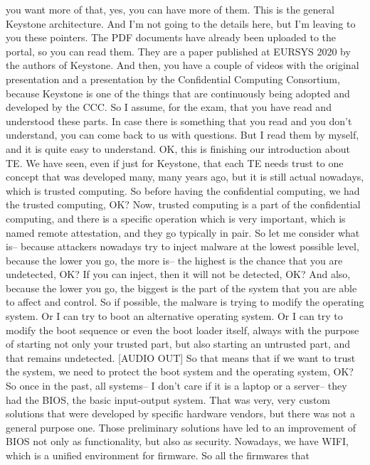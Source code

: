  you want more of that, yes, you can have more of them. This is the general
 Keystone architecture. And I'm not going to the details here, but I'm leaving
 to you these pointers. The PDF documents have already been uploaded to the
 portal, so you can read them. They are a paper published at EURSYS 2020 by the
 authors of Keystone. And then, you have a couple of videos with the original
 presentation and a presentation by the Confidential Computing Consortium,
 because Keystone is one of the things that are continuously being adopted and
 developed by the CCC. So I assume, for the exam, that you have read and
 understood these parts. In case there is something that you read and you don't
 understand, you can come back to us with questions. But I read them by myself,
 and it is quite easy to understand. OK, this is finishing our introduction
 about TE. We have seen, even if just for Keystone, that each TE needs trust to
 one concept that was developed many, many years ago, but it is still actual
 nowadays, which is trusted computing. So before having the confidential
 computing, we had the trusted computing, OK? Now, trusted computing is a part
 of the confidential computing, and there is a specific operation which is very
 important, which is named remote attestation, and they go typically in pair.
 So let me consider what is-- because attackers nowadays try to inject malware
 at the lowest possible level, because the lower you go, the more is-- the
 highest is the chance that you are undetected, OK? If you can inject, then it
 will not be detected, OK? And also, because the lower you go, the biggest is
 the part of the system that you are able to affect and control. So if
 possible, the malware is trying to modify the operating system. Or I can try
 to boot an alternative operating system. Or I can try to modify the boot
 sequence or even the boot loader itself, always with the purpose of starting
 not only your trusted part, but also starting an untrusted part, and that
 remains undetected. [AUDIO OUT] So that means that if we want to trust the
 system, we need to protect the boot system and the operating system, OK? So
 once in the past, all systems-- I don't care if it is a laptop or a server--
 they had the BIOS, the basic input-output system. That was very, very custom
 solutions that were developed by specific hardware vendors, but there was not
 a general purpose one. Those preliminary solutions have led to an improvement
 of BIOS not only as functionality, but also as security. Nowadays, we have
 WIFI, which is a unified environment for firmware. So all the firmwares that
